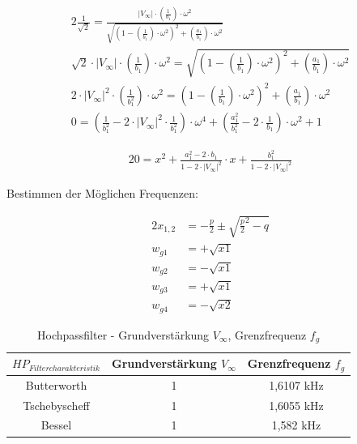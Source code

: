 \begin{alignat}{2}
\frac{1}{\sqrt{2}} = \frac{\lvert V_{\infty} \rvert \cdot \left(\frac{1}{b_{1}} \right) \cdot \omega^2}{\sqrt{\left(1 - \left(\frac{1}{b_{1}} \right) \cdot \omega^2 \right)^2 + \left(\frac{a_{1}}{b_{1}} \right) \cdot \omega^2}}\\
\sqrt{2} \cdot \lvert V_{\infty} \rvert \cdot \left(\frac{1}{b_{1}} \right) \cdot \omega^2 = \sqrt{\left(1 - \left(\frac{1}{b_{1}} \right) \cdot \omega^2 \right)^2 + \left(\frac{a_{1}}{b_{1}} \right) \cdot \omega^2}\\
2 \cdot \lvert V_{\infty} \rvert^2 \cdot \left(\frac{1}{b_{1}^2} \right) \cdot \omega^2 = \left(1 - \left(\frac{1}{b_{1}} \right) \cdot \omega^2 \right)^2 + \left(\frac{a_{1}}{b_{1}} \right) \cdot \omega^2\\
0 = \left( \frac{1}{b_{1}^2} - 2 \cdot \lvert V_{\infty} \rvert^2 \cdot \frac{1}{b_{1}^2} \right) \cdot \omega^4 + \left(\frac{a_{1}^2}{b_{1}^2} - 2 \cdot \frac{1}{b_{1}} \right) \cdot \omega^2 + 1
\end{alignat}




\begin{alignat}{2}
0 = x^2 + \frac{a_{1}^2 - 2 \cdot b_{1}}{1 - 2 \cdot \lvert V_{\infty} \rvert^2} \cdot x + \frac{b_{1}^2}{1 - 2 \cdot \lvert V_{\infty} \rvert^2}
\end{alignat}

\noindent Bestimmen der Möglichen Frequenzen:

\begin{alignat}{2}
x_{1,2} &= -\frac{p}{2} \pm \sqrt{\frac{p}{2}^2 - q}\\
w_{g1} &= +\sqrt{x1}\\
w_{g2} &= -\sqrt{x1}\\
w_{g3} &= +\sqrt{x1}\\
w_{g4} &= -\sqrt{x2}
\end{alignat}

\newpage

\begin{table}[h]
	\centering
	\begin{tabular}{c|c|c}
		$HP_{Filtercharakteristik}$ & Grundverstärkung $V_{\infty}$	& Grenzfrequenz $f_{g}$	\\
		\hline
		\hline
		Butterworth	& 1	& 1,6107 kHz	\\
		Tschebyscheff	& 1	& 1,6055 kHz	\\
		Bessel	& 1	& 1,582 kHz 	\\
	\end{tabular}
	\caption{Hochpassfilter - Grundverstärkung $V_{\infty}$, Grenzfrequenz $f_{g}$ }
	\label{tab:Hochpaesse_Grundverstaerkung}
\end{table}


